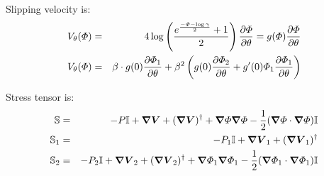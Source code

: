 Slipping velocity is:
\begin{eqnarray}
V_\theta(\varPhi) &=& 4\log\left(\frac{e^\frac{-\varPhi-\log\gamma}{2}+1}{2}\right)\frac{\partial \varPhi}{\partial \theta} 
= g(\varPhi) \frac{\partial \varPhi}{\partial \theta} 
\\
V_\theta(\varPhi) &=& \beta \cdot g(0) \frac{\partial \varPhi_1}{\partial \theta} +
\beta^2 \left(g(0) \frac{\partial \varPhi_2}{\partial \theta} + g'(0) \varPhi_1 \frac{\partial \varPhi_1}{\partial \theta}\right)
\end{eqnarray}

Stress tensor is:
\begin{eqnarray}
  \mathbb{S} &=& -P \mathbb{I} + \boldsymbol{\nabla} \boldsymbol{V} + (\boldsymbol{\nabla} \boldsymbol{V})^\dagger +
  \boldsymbol{\nabla} \varPhi \boldsymbol{\nabla} \varPhi - \frac{1}{2} (\boldsymbol{\nabla} \varPhi \cdot \boldsymbol{\nabla} \varPhi) \mathbb{I}
  \\
  \mathbb{S}_1 &=& -P_1 \mathbb{I} + \boldsymbol{\nabla} \boldsymbol{V}_1 + (\boldsymbol{\nabla} \boldsymbol{V}_1)^\dagger
  \\
  \mathbb{S}_2 &=& -P_2 \mathbb{I} + \boldsymbol{\nabla} \boldsymbol{V}_2 + (\boldsymbol{\nabla} \boldsymbol{V}_2)^\dagger + \boldsymbol{\nabla} \varPhi_1 \boldsymbol{\nabla} \varPhi_1 - \frac{1}{2} (\boldsymbol{\nabla} \varPhi_1 \cdot \boldsymbol{\nabla} \varPhi_1) \mathbb{I}
\end{eqnarray} 